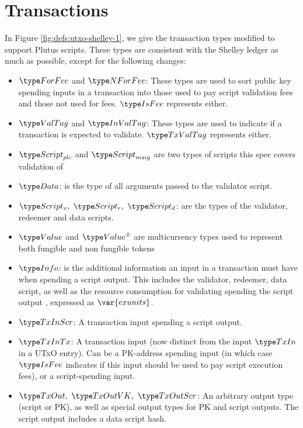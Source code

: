 \section{Transactions}
\label{sec:transactions}

In Figure \ref{fig:defs:utxo-shelley-1}, we give the transaction types modified
to support Plutus scripts. These types are consistent with the Shelley ledger
as much as possible,
except for the following changes:

\begin{itemize}
  \item $\ForFee$ and $\NForFee$: These types are used to sort public key
  spending inputs in a transaction into those used to pay script validation
  fees and those not used
  for fees. $\IsFee$ represents either.

  \item $\ValTag$ and $\InValTag$: These types are used to indicate if a
  transaction is expected to validate.
  $\TxValTag$ represents either.

  \item $\ScriptPlutus$ and $\ScriptMSig$ are two types of scripts this spec
  covers validation of

  \item $\Data$: is the type of all arguments passed to the validator script.

  \item $\ScriptV,~ \ScriptR,~ \ScriptD$: are the types of the validator,
  redeemer and data scripts.

  \item $\Value$ and $\ValuePM$ are multicurrency types used to represent
  both fungible and non fungible tokens

  \item $\Info$: is the additional information an input in a transaction must
  have when spending a script output. This includes the validator, redeemer,
  data script,
  as well as the resource consumption for validating spending the script output
  , expressed as $\var{exunits}$.

  \item $\TxInScr$: A transaction input spending a script output.

  \item $\TxInTx$: A transaction input (now distinct from the input $\TxIn$ in
  a UTxO entry). Can be a PK-address spending input
  (in which case $\IsFee$ indicates if this input should be used to pay script execution
  fees), or a script-spending input.

  \item $\TxOut,~\TxOutVK,~\TxOutScr$: An arbitrary output type (script or PK),
  as well as special output types for PK and script outputs. The script output
  includes a data script hash.
\end{itemize}


